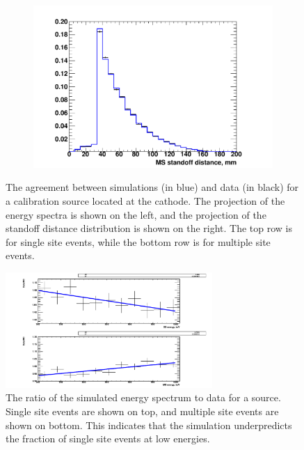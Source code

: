 \documentclass[herrin-thesis.tex]{subfiles}
\begin{document}
\begin{figure}[htp]
\begin{subfigure}[c]{0.48\textwidth}
	\end{subfigure}\hfill%
	\begin{subfigure}[c]{0.48\textwidth}
	\centering
	\includegraphics[width=\textwidth]{./plots/analysis_shape_agreement_sd_ThS5MSlin.pdf}
	\end{subfigure}
\caption[Agreement between simulation and data for a  calibration source]{The agreement between simulations (in blue) and data (in black) for a  calibration source located at the cathode. The projection of the energy spectra is shown on the left, and the projection of the standoff distance distribution is shown on the right. The top row is for single site events, while the bottom row is for multiple site events.}
\label{fig:analysis_shape_agreement}
\end{figure}

\begin{figure}[htp]
\centering
\includegraphics[width=0.7\textwidth]{./plots/analysis_shape_agreement_ratio.pdf}
\caption[Ratio of simulated spectra to data as a function of energy]{The ratio of the simulated energy spectrum to data for a  source. Single site events are shown on top, and multiple site events are shown on bottom. This indicates that the simulation underpredicts the fraction of single site events at low energies.}
\label{fig:analysis_shape_agreement_ratio}
\end{figure}
\end{document}
